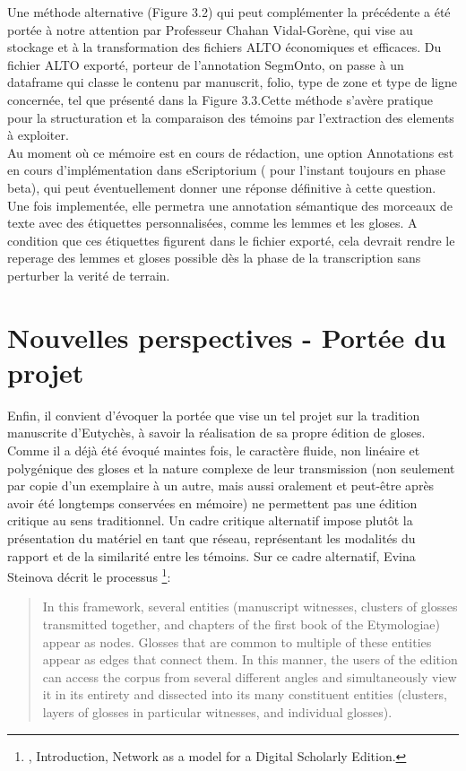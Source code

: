 \documentclass[a4paper, twoside, 12pt]{book}
\begin{document}
Une méthode alternative (Figure 3.2) qui peut complémenter la précédente a été portée à notre attention par Professeur Chahan Vidal-Gorène, qui vise au stockage et à la transformation des fichiers ALTO économiques et efficaces. Du fichier ALTO exporté, porteur de l'annotation SegmOnto, on passe à un dataframe qui classe le contenu par manuscrit, folio, type de zone et type de ligne concernée, tel que présenté dans la Figure 3.3.Cette méthode s'avère pratique pour la structuration et la comparaison des témoins par l'extraction des elements à exploiter. \\

Au moment où ce mémoire est en cours de rédaction, une option \og{} Annotations \fg{} est en cours d'implémentation dans eScriptorium ( pour l'instant toujours en phase beta), qui peut éventuellement donner une réponse définitive à cette question. Une fois implementée, elle permetra une annotation sémantique des morceaux de texte avec des étiquettes personnalisées, comme les lemmes et les gloses. A condition que ces étiquettes figurent dans le fichier exporté, cela devrait rendre le reperage des lemmes et gloses possible dès la phase de la transcription sans perturber la verité de terrain.


\section{Nouvelles perspectives - Portée du projet}

Enfin, il convient d'évoquer la portée que vise un tel projet sur la tradition manuscrite d'Eutychès, à savoir la réalisation de sa propre édition de gloses.
Comme il a déjà été évoqué maintes fois, le caractère fluide, non linéaire et polygénique des gloses et la nature complexe de leur transmission (non seulement par copie d'un exemplaire à un autre, mais aussi oralement et peut-être après avoir été longtemps conservées en mémoire) ne permettent pas une édition critique au sens traditionnel. Un cadre critique alternatif impose plutôt la présentation du matériel en tant que réseau, représentant les modalités du rapport et de la similarité entre les témoins. Sur ce cadre alternatif, Evina Steinova décrit le processus \footnote{\cite{steinova2021glosses}, Introduction, Network as a model for a Digital Scholarly Edition.}:

\blockquote{In this framework, several entities (manuscript witnesses, clusters of glosses transmitted together, and chapters of the first book of the Etymologiae) appear as nodes. Glosses that are common to multiple of these entities appear as edges that connect them. In this manner, the users of the edition can access the corpus from several different angles and simultaneously view it in its entirety and dissected into its many constituent entities (clusters, layers of glosses in particular witnesses, and individual glosses).}
\end{document}
